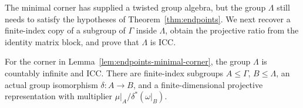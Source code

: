 The minimal corner has supplied a twisted group algebra, but the group
$\Lambda$ still needs to satisfy the hypotheses of
Theorem~\ref{thm:endpoints}. We next recover a finite-index copy of a
subgroup of $\Gamma$ inside $\Lambda$, obtain the projective ratio from
the identity matrix block, and prove that $\Lambda$ is ICC.

\begin{proposition}
\label{prop:endpoints-corner-constraints}
For the corner in Lemma~\ref{lem:endpoints-minimal-corner}, the group
\(\Lambda\) is countably infinite and ICC.  There are finite-index
subgroups \(A\leq\Gamma\), \(B\leq\Lambda\), an actual group
isomorphism \(\delta:A\to B\), and a finite-dimensional projective
representation with multiplier
\(\mu|_A/\delta^*(\omega|_B)\).
\end{proposition}

